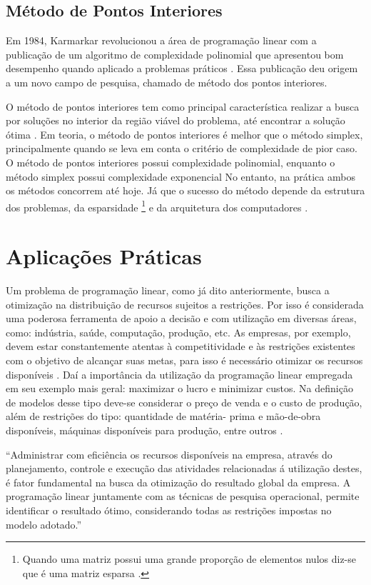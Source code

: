 \subsection{Método de Pontos Interiores}
Em 1984, Karmarkar revolucionou a área de programação linear com a publicação de um algoritmo de complexidade polinomial que apresentou bom desempenho quando aplicado a problemas práticos \cite{MaculanPI}. Essa publicação deu origem a um novo campo de pesquisa, chamado de método dos pontos interiores. 

O método de pontos interiores tem como principal característica realizar a busca por soluções no interior da região viável do problema, até encontrar a solução ótima \cite{Pinto}.
Em teoria, o método de pontos interiores é melhor que o método simplex, principalmente quando se leva em conta o critério de complexidade de pior caso. O método de pontos interiores possui complexidade polinomial, enquanto o método simplex possui complexidade exponencial No entanto, na prática ambos os métodos concorrem até hoje. Já que o sucesso do método depende da estrutura dos problemas, da esparsidade \footnote{Quando uma matriz possui uma grande proporção de elementos nulos diz-se que é uma matriz esparsa \cite{Munari}.} e da arquitetura dos computadores \cite{MaculanPI}.

\section{Aplicações Práticas}
Um problema de programação linear, como já dito anteriormente, busca a otimização na distribuição de recursos sujeitos a restrições. Por isso é considerada uma poderosa ferramenta de apoio a decisão \cite{FrossardMaxMin} e com utilização em diversas áreas, como: indústria, saúde, computação, produção, etc.
As empresas, por exemplo, devem estar constantemente atentas à competitividade e às restrições existentes com o objetivo de alcançar suas metas, para isso é necessário otimizar os recursos disponíveis \cite{FrossardMaxMin}. Daí a importância da utilização da programação linear empregada em seu exemplo mais geral: maximizar o lucro e minimizar custos.  Na definição de modelos desse tipo deve-se considerar o preço de venda e o custo de produção, além de restrições do tipo: quantidade de matéria- prima e mão-de-obra disponíveis, máquinas disponíveis para produção, entre outros \cite{FrossardMaxMin}.

\begin{citacao}
“Administrar com eficiência os recursos disponíveis na empresa, através do planejamento, controle e execução das atividades relacionadas á utilização destes, é fator fundamental na busca da otimização do resultado global da empresa. A programação linear juntamente com as técnicas de pesquisa operacional, permite identificar o resultado ótimo, considerando todas as restrições impostas no modelo adotado.” \cite[p.~31]{FrossardMaxMin}
\end{citacao}

